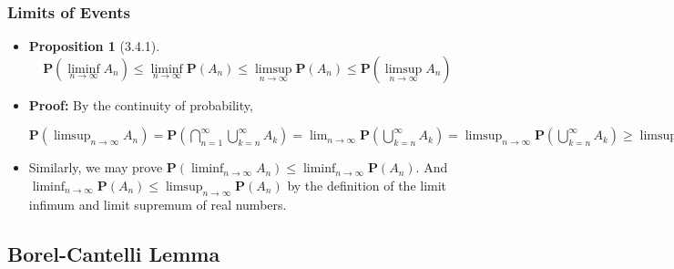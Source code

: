 \documentclass[handout]{beamer}
\newtheorem{Proposition}[theorem]{Proposition}%
\newcommand{\BP}{\mathbf{P}}
\begin{document}
\frame
{
  \frametitle{Limits of Events}

   \begin{itemize}


\item<1->[] 
\begin{Proposition}[3.4.1] 
$$\BP(\liminf_{n\rightarrow \infty} A_n) \leq \liminf_{n\rightarrow \infty} \BP(A_n)\leq \limsup_{n\rightarrow \infty} \BP(A_n)\leq \BP(\limsup_{n\rightarrow \infty} A_n) $$
\end{Proposition}
                           
\item<2->  \textbf{Proof:} By the continuity of probability, 
                             
$\BP(\limsup_{n\rightarrow \infty} A_n)=\BP(\bigcap_{n=1}^{\infty} \bigcup_{k=n}^{\infty} A_k)=\lim_{n\rightarrow \infty} \BP(\bigcup_{k=n}^{\infty} A_k) = \limsup_{n\rightarrow \infty} \BP(\bigcup_{k=n}^{\infty} A_k) \geq  \limsup_{n\rightarrow \infty} \BP(A_n )$
               
\item<2-> [-] Similarly, we may prove  $\BP(\liminf_{n\rightarrow \infty} A_n) \leq \liminf_{n\rightarrow \infty} \BP(A_n)$. And  $\liminf_{n\rightarrow \infty} \BP(A_n)\leq \limsup_{n\rightarrow \infty} \BP(A_n)$ by the definition of the limit infimum and limit supremum of real numbers.                  \end{itemize}
}

\subsection{Borel-Cantelli Lemma}
\end{document}
